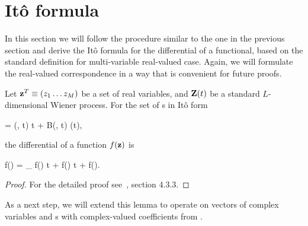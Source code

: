 \section{It\^{o} formula}

In this section we will follow the procedure similar to the one in the previous section and derive the It\^{o} formula for the differential of a functional, based on the standard definition for multi-variable real-valued case.
Again, we will formulate the real-valued correspondence in a way that is convenient for future proofs.

\begin{lemma}
\label{lmm:fpe-sde:ito-formula:ito-f-real}
	Let $\mathbf{z}^T \equiv (z_1 \ldots z_M)$ be a set of real variables, and $\mathbf{Z}(t)$ be a standard $L$-dimensional Wiener process.
	For the set of s in It\^{o} form
	\begin{eqn*}
		\upd\zvec = \avec(\zvec, t) \upd t + B(\zvec, t) \upd\Zvec(t),
	\end{eqn*}
	the differential of a function $f(\mathbf{z})$ is
	\begin{eqn*}
		\upd f(\zvec) =
			\avec \cdot \vcwd_{\zvec} f(\zvec) \upd t
			+   f(\zvec) \upd t
			+  f(\zvec).
	\end{eqn*}
\end{lemma}
\begin{proof}
For the detailed proof see~\cite{Gardiner1997}, section 4.3.3.
\end{proof}

As a next step, we will extend this lemma to operate on vectors of complex variables and s with complex-valued coefficients from .

